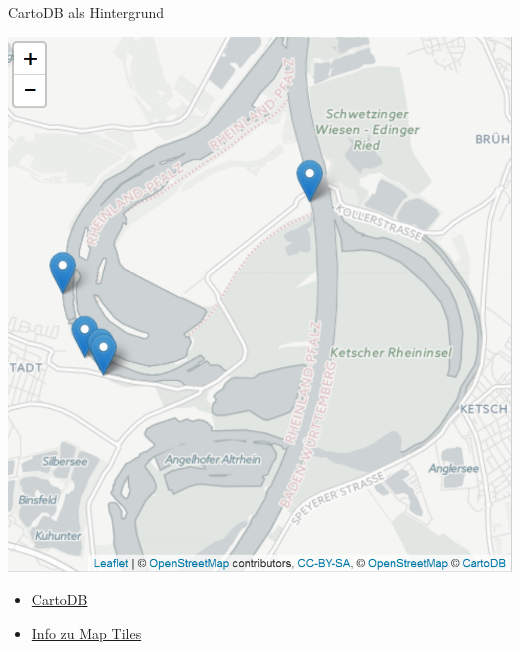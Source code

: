 \documentclass[ignorenonframetext,]{beamer}
\newenvironment{Shaded}{\begin{snugshade}}{\end{snugshade}}
\newcommand{\KeywordTok}[1]{\textcolor[rgb]{0.13,0.29,0.53}{\textbf{#1}}}
\newcommand{\StringTok}[1]{\textcolor[rgb]{0.31,0.60,0.02}{#1}}
\newcommand{\OperatorTok}[1]{\textcolor[rgb]{0.81,0.36,0.00}{\textbf{#1}}}
\newcommand{\NormalTok}[1]{#1}
\begin{document}
\begin{frame}[fragile]{CartoDB als Hintergrund}

\begin{Shaded}
\end{Shaded}

\includegraphics{figure/CartoDBInteractive.PNG}

\begin{itemize}
\item
  \href{https://carto.com/attribution}{CartoDB}
\item
  \href{https://www.mapbox.com/help/how-web-maps-work/}{Info zu Map
  Tiles}
\end{itemize}

\end{frame}
\end{document}
